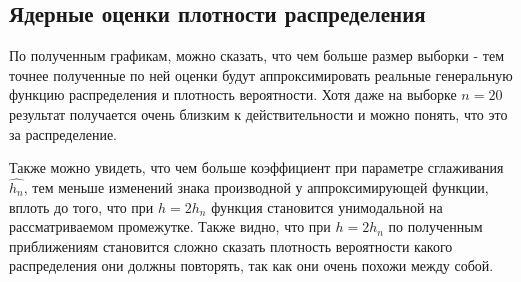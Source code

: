\subsection{Ядерные оценки плотности распределения}
	По полученным графикам, можно сказать, что чем больше размер выборки - тем точнее полученные по ней оценки будут аппроксимировать реальные генеральную функцию распределения и плотность вероятности. Хотя даже на выборке $n = 20$ результат получается очень близким к действительности и можно понять, что это за распределение.
	
	Также можно увидеть, что чем больше коэффициент при параметре сглаживания $\hat{h_n}$, тем меньше изменений знака производной у аппроксимирующей функции, вплоть до того, что при $h = 2h_n$ функция становится унимодальной на рассматриваемом промежутке. Также видно, что при $h = 2h_n$ по полученным приближениям становится сложно сказать плотность вероятности какого распределения они должны повторять, так как они очень похожи между собой.